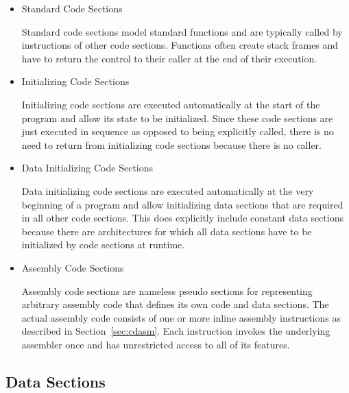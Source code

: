 \begin{itemize}

\item Standard Code Sections\alignright{}\nopagebreak

Standard code sections model standard functions and are typically called by instructions of other code sections.
Functions often create stack frames and have to return the control to their caller at the end of their execution.

\item Initializing Code Sections\alignright{}\nopagebreak

Initializing code sections are executed automatically at the start of the program and allow its state to be initialized.
Since these code sections are just executed in sequence as opposed to being explicitly called, there is no need to return from initializing code sections because there is no caller.

\item Data Initializing Code Sections\alignright{}\nopagebreak

Data initializing code sections are executed automatically at the very beginning of a program and allow initializing data sections that are required in all other code sections.
This does explicitly include constant data sections because there are architectures for which all data sections have to be initialized by code sections at runtime.

\item Assembly Code Sections\alignright{}\nopagebreak

Assembly code sections are nameless pseudo sections for representing arbitrary assembly code that defines its own code and data sections.
The actual assembly code consists of one or more inline assembly instructions as described in Section~\ref{sec:cdasm}.
Each instruction invokes the underlying assembler once and has unrestricted access to all of its features.

\end{itemize}

\subsection{Data Sections}

